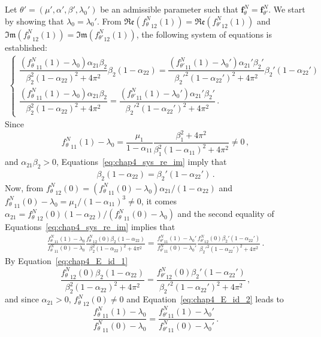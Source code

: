 \begin{subappendices}
Let $\theta' = (\mu', \alpha', \beta', \lambda_0')$ be an admissible parameter such that $\mathbf{f}_{\theta}^N = \mathbf{f}_{\theta'}^N$.
We start by showing that $\lambda_0 = \lambda_0'$.
From $\mathfrak{Re} \left( {f_\theta^N}_{12}(1) \right) = \mathfrak{Re} \left({f_{\theta'}^N}_{12}(1) \right)$ and $\mathfrak{Im} \left( {f_\theta^N}_{12}(1) \right) = \mathfrak{Im} \left( {f_{\theta'}^N}_{12}(1) \right)$,
the following system of equations is established:
\begin{align}\label{eq:chap4_sys_re_im}
\begin{cases}
\dfrac{({f_\theta^N}_{11}(1) - \lambda_0)\alpha_{21} \beta_2}{\beta_2^2(1-\alpha_{22})^2 + 4\pi^2} \beta_2(1-\alpha_{22}) = \dfrac{({f_{\theta'}^N}_{11}(1) - \lambda_0')\alpha_{21}' \beta_2'}{{\beta_2'}^2(1-\alpha_{22}')^2 + 4\pi^2} \beta_2'(1-\alpha_{22}') \\
\dfrac{({f_\theta^N}_{11}(1) - \lambda_0)\alpha_{21} \beta_2}{\beta_2^2(1-\alpha_{22})^2 + 4\pi^2} = \dfrac{({f_{\theta'}^N}_{11}(1) - \lambda_0')\alpha_{21}' \beta_2'}{ {\beta_2'}^2(1-\alpha_{22}')^2 + 4\pi^2}\,.
\end{cases}
\end{align}
Since
\[
{f_\theta^N}_{11}(1) - \lambda_0 = \frac{\mu_1}{1-\alpha_{11}}\frac{\beta_1^2 + 4 \pi^2}{\beta_1^2(1-\alpha_{11})^2 + 4\pi^2} \neq 0 \,,
\]
and $\alpha_{21} \beta_2 > 0$,
Equations~\eqref{eq:chap4_sys_re_im} imply that
\begin{align}\label{eq:chap4_E_id_1}
\beta_2(1-\alpha_{22}) = \beta_2'(1-\alpha_{22}') \,.
\end{align}
Now, from ${f_\theta^N}_{12}(0) = \left( {f_\theta^N}_{11}(0) - \lambda_0 \right) \alpha_{21} / (1-\alpha_{22})$
and ${f_\theta^N}_{11}(0) - \lambda_0 = \mu_1 / (1-\alpha_{11})^3 \neq 0$,
it comes $\alpha_{21} = {f_\theta^N}_{12}(0) (1-\alpha_{22}) / \left( {f_\theta^N}_{11}(0) - \lambda_0 \right)$ and the second equality of Equations~\eqref{eq:chap4_sys_re_im} implies that
\begin{align}\label{eq:chap4_E_id_2}
\frac{{f_\theta^N}_{11}(1) - \lambda_0}{{f_\theta^N}_{11}(0) - \lambda_0} \frac{{f_\theta^N}_{12}(0)\beta_2(1-\alpha_{22})}{\beta_2^2(1-\alpha_{22})^2 + 4\pi^2} = \frac{{f_{\theta'}^N}_{11}(1) - \lambda_0'}{{f_{\theta'}^N}_{11}(0) - \lambda_0'} \frac{{f_{\theta'}^N}_{12}(0){\beta_2'}(1-\alpha_{22}')}{{\beta_2'}^2(1-\alpha_{22}')^2 + 4\pi^2}\,.
\end{align}
By Equation~\eqref{eq:chap4_E_id_1}
\[
\frac{{f_\theta^N}_{12}(0)\beta_2(1-\alpha_{22})}{\beta_2^2(1-\alpha_{22})^2 + 4\pi^2} = \frac{{f_{\theta'}^N}_{12}(0){\beta_2'}(1-\alpha_{22}')}{{\beta_2'}^2(1-\alpha_{22}')^2 + 4\pi^2}\,,
\]
and since $\alpha_{21} > 0$, ${f_\theta^N}_{12}(0) \neq 0$ and Equation~\eqref{eq:chap4_E_id_2} leads to
\[
\frac{{f_\theta^N}_{11}(1) - \lambda_0}{{f_\theta^N}_{11}(0) - \lambda_0} = \frac{{f_{\theta'}^N}_{11}(1) - \lambda_0'}{{f_{\theta'}^N}_{11}(0) - \lambda_0'}\,.
\]


\end{subappendices}
